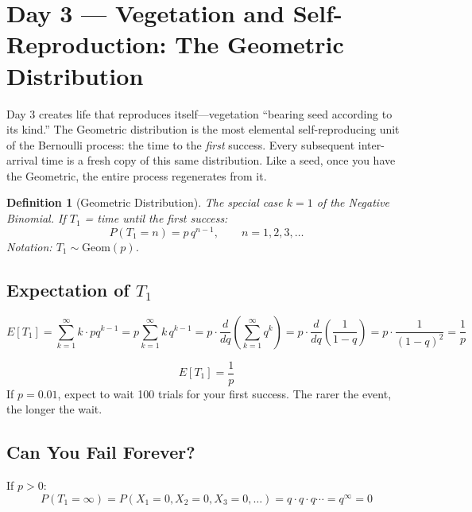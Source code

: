 \documentclass[11pt]{article}
\newtheorem{definition}{Definition}
\begin{document}
\section{Day 3 --- Vegetation and Self-Reproduction: The Geometric Distribution}

\begin{creationbox}
Day 3 creates life that reproduces itself---vegetation ``bearing seed according to its kind.'' The Geometric distribution is the most elemental self-reproducing unit of the Bernoulli process: the time to the \emph{first} success. Every subsequent inter-arrival time is a fresh copy of this same distribution. Like a seed, once you have the Geometric, the entire process regenerates from it.
\end{creationbox}

\begin{definition}[Geometric Distribution]
The special case $k = 1$ of the Negative Binomial. If $T_1$ = time until the first success:
\[
\boxed{P(T_1 = n) = p \, q^{n-1}, \qquad n = 1, 2, 3, \ldots}
\]
Notation: $T_1 \sim \text{Geom}(p)$.
\end{definition}

\subsection{Expectation of $T_1$}

\[
E[T_1] = \sum_{k=1}^{\infty} k \cdot p q^{k-1} = p \sum_{k=1}^{\infty} k \, q^{k-1} = p \cdot \frac{d}{dq}\left(\sum_{k=1}^{\infty} q^k\right) = p \cdot \frac{d}{dq}\left(\frac{1}{1-q}\right) = p \cdot \frac{1}{(1-q)^2} = \frac{1}{p}
\]

\begin{conceptbox}
\[
\boxed{E[T_1] = \frac{1}{p}}
\]
If $p = 0.01$, expect to wait 100 trials for your first success. The rarer the event, the longer the wait.
\end{conceptbox}

\subsection{Can You Fail Forever?}

If $p > 0$:
\[
P(T_1 = \infty) = P(X_1 = 0, X_2 = 0, X_3 = 0, \ldots) = q \cdot q \cdot q \cdots = q^\infty = 0
\]
\end{document}
